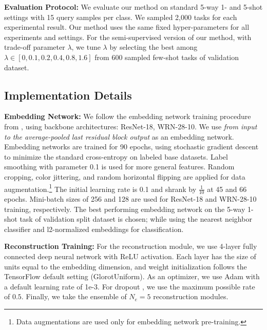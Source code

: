 \documentclass{article}
\begin{document}
\textbf{Evaluation Protocol:}
We evaluate our method on standard 5-way 1- and 5-shot settings with 15 query samples per class. We sampled 2,000 tasks for each experimental result. Our method uses the same fixed hyper-parameters for all experiments and settings. For the semi-supervised version of our method, with trade-off parameter $\lambda$, we tune $\lambda$ by selecting the best among $\lambda\in[0, 0.1, 0.2, 0.4, 0.8, 1.6]$ from 600 sampled few-shot tasks of validation dataset.


\subsection{Implementation Details}
\label{implementation_detail}
\textbf{Embedding Network:}
We follow the embedding network training procedure from \citet{LaplacianShot}, using backbone architectures: ResNet-18, WRN-28-10. We use \textit{from input to the average-pooled last residual block output} as an embedding network. Embedding networks are trained for 90 epochs, using stochastic gradient descent to minimize the standard cross-entropy on labeled base datasets. Label smoothing with parameter 0.1 is used for more general features. Random cropping, color jittering, and random horizontal flipping are applied for data augmentation.\footnote{Data augmentations are used only for embedding network pre-training.} The initial learning rate is 0.1 and shrank by $\frac{1}{10}$ at 45 and 66 epochs. Mini-batch sizes of 256 and 128 are used for ResNet-18 and WRN-28-10 training, respectively. The best performing embedding network on the 5-way 1-shot task of validation split dataset is chosen; while using the nearest neighbor classifier and l2-normalized embeddings for classification.

\textbf{Reconstruction Training:}
For the reconstruction module, we use 4-layer fully connected deep neural network with ReLU activation. Each layer has the size of units equal to the embedding dimension, and weight initialization follows the TensorFlow \cite{abadi2016tensorflow} default setting (GlorotUniform). As an optimizer, we use Adam \cite{kingma2014adam} with a default learning rate of 1e-3. For dropout \cite{dropout}, we use the maximum possible rate of $0.5$. Finally, we take the ensemble of $N_e=5$ reconstruction modules.
\end{document}
